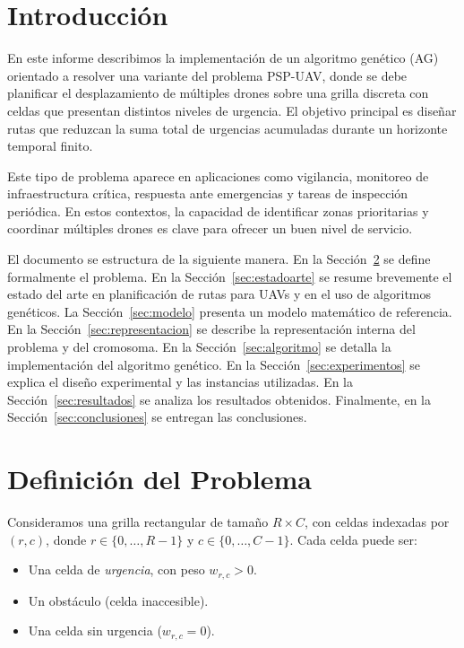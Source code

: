 \documentclass[11pt,a4paper]{article}
\begin{document}
\section{Introducción}

En este informe describimos la implementación de un algoritmo genético (AG) orientado a resolver una variante del problema PSP-UAV, donde se debe planificar el desplazamiento de múltiples drones sobre una grilla discreta con celdas que presentan distintos niveles de urgencia. El objetivo principal es diseñar rutas que reduzcan la suma total de urgencias acumuladas durante un horizonte temporal finito.

Este tipo de problema aparece en aplicaciones como vigilancia, monitoreo de infraestructura crítica, respuesta ante emergencias y tareas de inspección periódica. En estos contextos, la capacidad de identificar zonas prioritarias y coordinar múltiples drones es clave para ofrecer un buen nivel de servicio.

El documento se estructura de la siguiente manera. En la Sección~\ref{sec:definicion} se define formalmente el problema. En la Sección~\ref{sec:estadoarte} se resume brevemente el estado del arte en planificación de rutas para UAVs y en el uso de algoritmos genéticos. La Sección~\ref{sec:modelo} presenta un modelo matemático de referencia. En la Sección~\ref{sec:representacion} se describe la representación interna del problema y del cromosoma. En la Sección~\ref{sec:algoritmo} se detalla la implementación del algoritmo genético. En la Sección~\ref{sec:experimentos} se explica el diseño experimental y las instancias utilizadas. En la Sección~\ref{sec:resultados} se analiza los resultados obtenidos. Finalmente, en la Sección~\ref{sec:conclusiones} se entregan las conclusiones.



\section{Definición del Problema}
\label{sec:definicion}

Consideramos una grilla rectangular de tamaño $R \times C$, con celdas indexadas por $(r,c)$, donde $r \in \{0,\dots,R-1\}$ y $c \in \{0,\dots,C-1\}$. Cada celda puede ser:
\begin{itemize}
    \item Una celda de \emph{urgencia}, con peso $w_{r,c} > 0$.
    \item Un obstáculo (celda inaccesible).
    \item Una celda sin urgencia ($w_{r,c}=0$).
\end{itemize}
\end{document}
